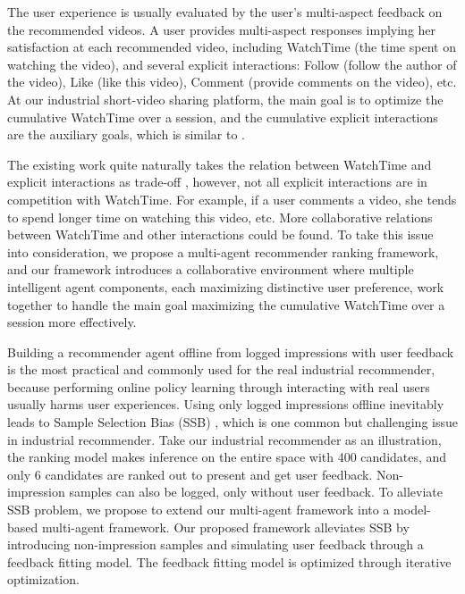 The user experience is usually evaluated by the user's multi-aspect feedback on the recommended videos. A user provides multi-aspect responses implying her satisfaction at each recommended video, including WatchTime (the time spent on watching the video), and several explicit interactions: Follow (follow the author of the video), Like (like this video), Comment (provide comments on the video), etc.
At our industrial short-video sharing platform, the main goal is to optimize the cumulative WatchTime over a session, and the cumulative explicit interactions are the auxiliary goals, which is similar to \cite{cai2023two}.

The existing work quite naturally takes the relation between WatchTime and explicit interactions as trade-off \cite{cai2023two, chen2021reinforcement}, however, not all explicit interactions are in competition with WatchTime. For example, if a user comments a video, she tends to spend longer time on watching this video,  etc. More collaborative relations between WatchTime and other interactions could be found. To take this issue into consideration, we propose a multi-agent recommender ranking framework, and our framework introduces a collaborative environment where multiple intelligent agent components, each maximizing distinctive user preference, work together to handle the main goal maximizing the cumulative WatchTime over a session more effectively.

Building a recommender agent offline from logged impressions with user feedback is the most practical and commonly used for the real industrial recommender, because performing online policy learning through interacting with real users usually harms user experiences. Using only logged impressions offline inevitably leads to Sample Selection Bias (SSB) \cite{ESMM2018,XuZixuan2022SSB}, which is one common but challenging issue in industrial recommender. 
Take our industrial recommender as an illustration, the ranking model makes inference on the entire space with 400 candidates, and only 6 candidates are ranked out to present and get user feedback.
Non-impression samples can also be logged, only without user feedback.
To alleviate SSB problem, we propose to extend our multi-agent framework into a model-based multi-agent framework. 
Our proposed framework alleviates SSB by introducing non-impression samples and simulating user feedback through a feedback fitting model. The feedback fitting model is optimized through iterative optimization.

